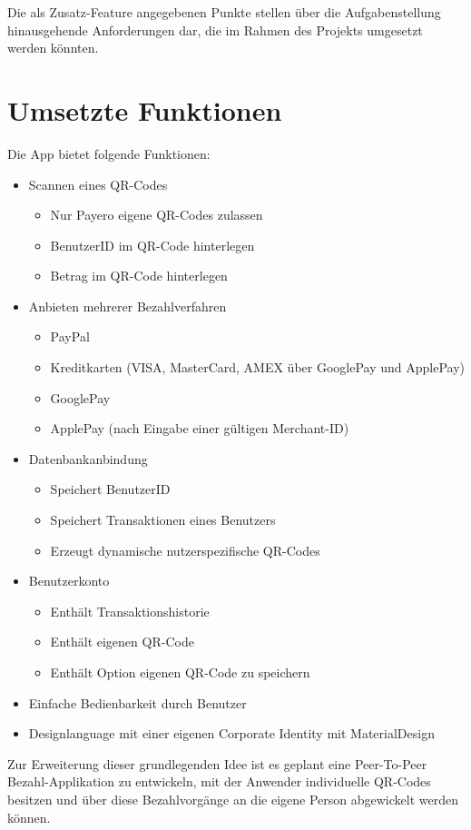 Die als Zusatz-Feature angegebenen Punkte stellen über die Aufgabenstellung hinausgehende Anforderungen dar, die im Rahmen des Projekts umgesetzt werden könnten.


\section{Umsetzte Funktionen}

Die App bietet folgende Funktionen:

\begin{itemize}
    \item Scannen eines QR-Codes
    \begin{itemize}
        \item Nur Payero eigene QR-Codes zulassen
        \item BenutzerID im QR-Code hinterlegen
        \item Betrag im QR-Code hinterlegen
    \end{itemize}
    \item Anbieten mehrerer Bezahlverfahren
    \begin{itemize}
        \item PayPal
        \item Kreditkarten (VISA, MasterCard, AMEX über GooglePay und ApplePay)
        \item GooglePay
        \item ApplePay (nach Eingabe einer gültigen Merchant-ID)
    \end{itemize}
    \item Datenbankanbindung
    \begin{itemize}
        \item Speichert BenutzerID
        \item Speichert Transaktionen eines Benutzers
        \item Erzeugt dynamische nutzerspezifische QR-Codes
    \end{itemize}
    \item Benutzerkonto
    \begin{itemize}
        \item Enthält Transaktionshistorie
        \item Enthält eigenen QR-Code
        \item Enthält Option eigenen QR-Code zu speichern
    \end{itemize}
    \item Einfache Bedienbarkeit durch Benutzer
    \item Designlanguage mit einer eigenen Corporate Identity mit MaterialDesign
\end{itemize}

Zur Erweiterung dieser grundlegenden Idee ist es geplant eine Peer-To-Peer Bezahl-Applikation zu entwickeln, mit der Anwender individuelle QR-Codes besitzen und über diese Bezahlvorgänge an die eigene Person abgewickelt werden können.